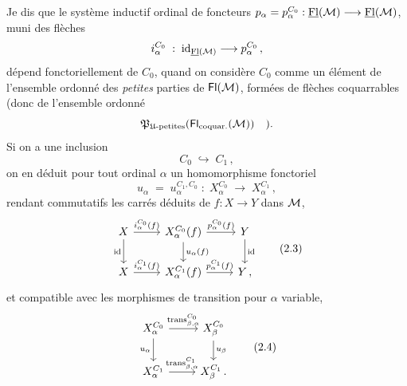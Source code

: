 Je dis que le système inductif ordinal de foncteurs $p_\alpha=p_\alpha^{C_0} : \underline{\mathrm{Fl}}(\mathcal{M})\longrightarrow\underline{\mathrm{Fl}}(\mathcal{M})$,
muni des flèches
\[
i_\alpha^{C_0} \;:\; \mathrm{id}_{\underline{\mathrm{Fl}}(\mathcal{M})} \longrightarrow p_\alpha^{C_0}\,,
\]
dépend fonctoriellement de $C_0$, quand on considère $C_0$ comme un élément de l'ensemble ordonné des \textit{petites} parties de $\mathsf{Fl}(\mathcal{M})$, formées de flèches coquarrables (donc de l'ensemble ordonné
\[
\mathfrak{P}_{\mathfrak{U}\text{-petites}}(\mathsf{Fl}_{\text{coquar.}}(\mathcal{M})) \quad ).
\]
Si on a une inclusion
\[
C_0 \;\hookrightarrow\; C_1\,,
\tag*{(2.1)}
\]
on en déduit pour tout ordinal $\alpha$ un homomorphisme fonctoriel
\[
u_\alpha \;=\; u_\alpha^{C_1,C_0} \;:\; X_\alpha^{C_0} \;\longrightarrow\; X_\alpha^{C_1}\,,
\tag*{(2.2)}
\]
rendant commutatifs les carrés déduits de $f : X\longrightarrow Y$ dans $\mathcal{M}$,
\[
\begin{tikzcd}
X \arrow[r, "i_\alpha^{C_0}(f)"] \arrow[d, "\mathrm{id}"'] & X_\alpha^{C_0}(f) \arrow[r, "p_\alpha^{C_0}(f)"] \arrow[d, "u_\alpha(f)"] & Y \arrow[d, "\mathrm{id}"] \\
X \arrow[r, "i_\alpha^{C_1}(f)"] & X_\alpha^{C_1}(f) \arrow[r, "p_\alpha^{C_1}(f)"] & Y\,,
\end{tikzcd}
\tag*{(2.3)}
\]
et compatible avec les morphismes de transition pour $\alpha$ variable,
\[
\begin{tikzcd}
X_\alpha^{C_0} \arrow[r, "{\mathrm{trans}_{\beta,\alpha}^{C_0}}"] \arrow[d, "u_\alpha"'] & X_\beta^{C_0} \arrow[d, "u_\beta"] \\
X_\alpha^{C_1} \arrow[r, "{\mathrm{trans}_{\beta,\alpha}^{C_1}}"] & X_\beta^{C_1}\,.
\end{tikzcd}
\tag*{(2.4)}
\]


